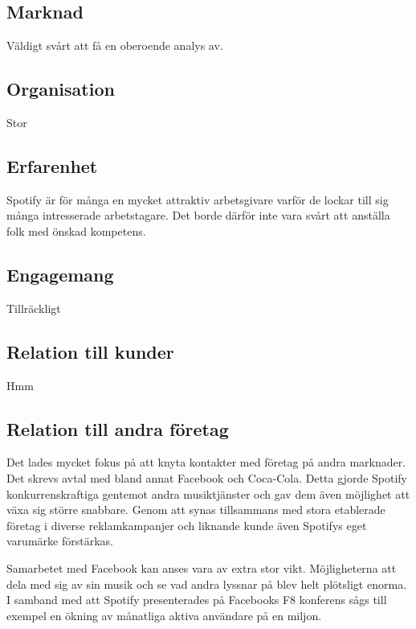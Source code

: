 \subsection{Marknad}
Väldigt svårt att få en oberoende analys av.

\subsection{Organisation}
Stor

\subsection{Erfarenhet}
Spotify är för många en mycket attraktiv arbetsgivare varför de lockar till sig många intresserade arbetstagare. Det borde därför inte vara svårt att anställa folk med önskad kompetens. 

\subsection{Engagemang}
Tillräckligt

\subsection{Relation till kunder}
Hmm

\subsection{Relation till andra företag}
Det lades mycket fokus på att knyta kontakter med företag på andra marknader. Det skrevs avtal med bland annat Facebook och Coca-Cola. Detta gjorde Spotify konkurrenskraftiga gentemot andra musiktjänster och gav dem även möjlighet att växa sig större snabbare. Genom att synas tillsammans med stora etablerade företag i diverse reklamkampanjer och liknande kunde även Spotifys eget varumärke förstärkas. 

Samarbetet med Facebook kan anses vara av extra stor vikt. Möjligheterna att dela med sig av sin musik och se vad andra lyssnar på blev helt plötsligt enorma. I samband med att Spotify presenterades på Facebooks F8 konferens sågs till exempel en ökning av månatliga aktiva användare på en miljon. 


